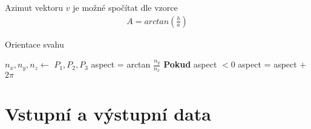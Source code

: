 \documentclass[a4paper,12pt]{article}
\begin{document}
    \noindent Azimut vektoru $v$ je možné spočítat dle vzorce
    \begin{align*}
        A = arctan\left(\frac{b}{a}\right)
    \end{align*}

    \begin{algorithm}[H]
    \caption {Orientace svahu}
    \begin{algorithmic}[1]
        \State $n_x, n_y, n_z \gets$ {$P_1, P_2, P_3$}
        \State aspect = arctan $\frac{n_y}{n_x}$
        \State \textbf{Pokud} aspect $< 0$
        \State \indent aspect = aspect + $2\pi$
    \end{algorithmic}
    \end{algorithm}

    \section{Vstupní a výstupní data}
\end{document}
